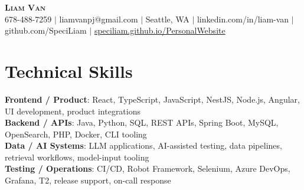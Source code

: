 \documentclass[letterpaper,11pt]{article}
\begin{document}

%
\begin{center}
    \textbf{\Huge \scshape Liam Van} \\ \vspace{1pt}
    \small 678-488-7259 $|$ \small {liamvanpj@gmail.com} $|$ Seattle, WA
 {{$|$ linkedin.com/in/liam-van} {$|$ github.com/SpeciLiam} {$|$ \href{https://speciliam.github.io/PersonalWebsite}{speciliam.github.io/PersonalWebsite}}}

\end{center}

\section{Technical Skills}
 \begin{itemize}[leftmargin=0.15in, label={}]
    \small{\item{
     \textbf{Frontend / Product}{: React, TypeScript, JavaScript, NestJS, Node.js, Angular, UI development, product integrations} \\
     \textbf{Backend / APIs}{: Java, Python, SQL, REST APIs, Spring Boot, MySQL, OpenSearch, PHP, Docker, CLI tooling} \\
     \textbf{Data / AI Systems}{: LLM applications, AI-assisted testing, data pipelines, retrieval workflows, model-input tooling} \\
     \textbf{Testing / Operations}{: CI/CD, Robot Framework, Selenium, Azure DevOps, Grafana, T2, release support, on-call response} \\
    }}
 \end{itemize}
%
\end{document}
